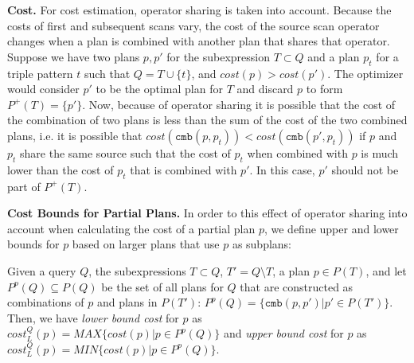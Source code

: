 \textbf{Cost.} For cost estimation, operator sharing is taken into account. Because the costs of first and subsequent scans vary, the cost of the source scan operator changes when a plan is
combined with another plan that shares that operator. 
Suppose we have two plans $p,p'$ for the subexpression $T \subset Q$
and a plan $p_t$ for a triple pattern $t$ such that $Q = T \cup
\{t\}$, and $cost(p) > cost(p')$. The optimizer would consider $p'$
to be the optimal plan for $T$ and discard $p$ to form
$P^+(T)=\{p'\}$. Now, because of operator sharing it is possible that
the cost of the combination of two plans is less than the sum of the
cost of the two combined plans, i.e. it is possible that $cost(\mathtt{cmb}(p,p_t)) < cost(\mathtt{cmb}(p',p_t))$ if 
$p$ and $p_t$ share the same source such that the cost of $p_t$ when combined with $p$ is much lower than the cost of $p_t$ that is combined with $p'$. In this case, $p'$ should not be
part of $P^+(T)$.


\textbf{Cost Bounds for Partial Plans.} In order to this effect of operator sharing into account when calculating the cost of a partial plan $p$, we
define upper and lower bounds for $p$ based on larger plans that use $p$ as subplans: 

\begin{definition}
  \label{def:bounds}
  Given a query $Q$, the subexpressions $T \subset Q$, $T' = Q \setminus T$, a
  plan $p \in P(T)$, and let $P^p(Q) \subseteq P(Q)$ be the set of all plans
  for $Q$ that are constructed as combinations of $p$ and plans in
  $P(T')$: $P^p(Q) = \{\mathtt{cmb}(p,p') | p' \in P(T')\}$.  Then, we have \emph{lower bound cost} for $p$ as $cost_L^Q(p)= MAX\{cost(p)| p \in P^p(Q)\}$ and \emph{upper bound cost} for $p$ as  
  $cost_L^Q(p)= MIN\{cost(p)| p \in P^p(Q)\}$.
\end{definition}

